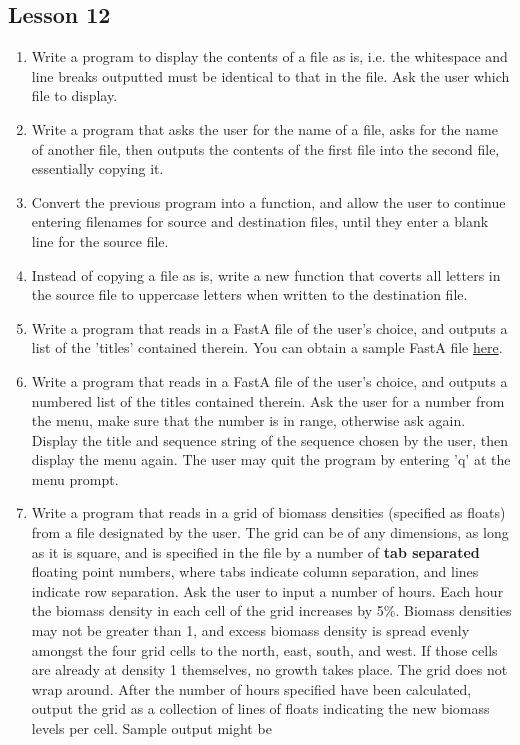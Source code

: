\documentclass[a4paper,11pt]{article}
\begin{document}
\subsection{Lesson 12}
\begin{enumerate}
	\item Write a program to display the contents of a file as is, i.e.    the whitespace and line breaks outputted must be identical to that    in the file. Ask the user which file to display.
	\item Write a program that asks the user for the name of a file, asks    for the name of another file, then outputs the contents of the    first file into the second file, essentially copying it.
	\item Convert the previous program into a function, and allow the    user to continue entering filenames for source and destination    files, until they enter a blank line for the source file.
	\item Instead of copying a file as is, write a new function that    coverts all letters in the source file to uppercase letters when    written to the destination file.
	\item Write a program that reads in a FastA file of the user's    choice, and outputs a list of the 'titles' contained therein. You    can obtain a sample FastA file \href{data/brca.fasta}{here}.
	\item Write a program that reads in a FastA file of the user's    choice, and outputs a numbered list of the titles contained    therein. Ask the user for a number from the menu, make sure that    the number is in range, otherwise ask again.  Display the title and    sequence string of the sequence chosen by the user, then display    the menu again. The user may quit the program by entering 'q' at    the menu prompt.
	\item Write a program that reads in a grid of biomass densities (specified as floats) from a file designated by the user. The grid can be of any dimensions, as long as it is square, and is specified in the file by a number of \textbf{     tab separated} floating point numbers, where tabs indicate column separation, and lines indicate row separation. Ask the user to input a number of hours. Each hour the biomass density in each cell of the grid increases by 5\%. Biomass     densities may not be greater than 1, and excess biomass density is spread evenly amongst the four grid cells to the north, east, south, and west. If those cells are already at density 1 themselves, no growth takes place. The grid does not wrap     around. After the number of hours specified have been calculated, output the grid as a collection of lines of floats indicating the new biomass levels per cell. Sample output might be     
\begin{lstlisting}


\end{lstlisting}
\end{enumerate}
\end{document}
